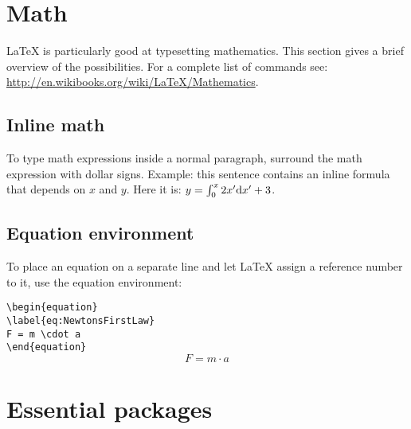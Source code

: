 \documentclass{article}
\begin{document}
\section{Math}

\LaTeX{} is particularly good at typesetting mathematics. This section gives a brief overview of the possibilities. For a complete list of commands see: \url{http://en.wikibooks.org/wiki/LaTeX/Mathematics}.

\subsection{Inline math}

To type math expressions inside a normal paragraph, surround the math expression with dollar signs. Example: this sentence contains an inline formula that depends on $x$ and $y$. Here it is: $y=\int_{0}^{x} 2x'\textnormal{d}x'+3 $.


\subsection{Equation environment}

To place an equation on a separate line and let \LaTeX{} assign a reference number to it, use the equation environment:
\vspace{1em}

\noindent\verb|\begin{equation}|\\
\verb|\label{eq:NewtonsFirstLaw}|\\
\verb|F = m \cdot a|\\
\verb|\end{equation}|\\

\begin{equation}
\label{eq:NewtonsFirstLaw}
F = m \cdot a
\end{equation}

\newpage
\section{Essential packages}
\end{document}
